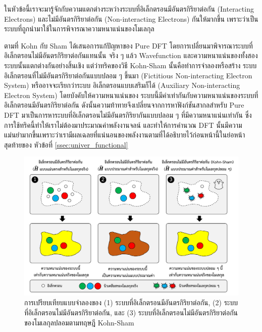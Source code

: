 ในหัวข้อนี้เราจะมารู้จักกับความแตกต่างระหว่างระบบที่อิเล็กตรอนมีอันตรกิริยาต่อกัน (Interacting Electrons) และไม่มีอันตรกิริยาต่อกัน 
(Non-interacting Electrons) กันให้มากขึ้น เพราะว่าเป็นระบบที่ถูกนำมาใช้ในการพิจารณาความหนาแน่นของโมเลกุล

ตามที่ Kohn กับ Sham ได้เสนอการแก้ปัญหาของ Pure DFT โดยการเปลี่ยนมาพิจารณาระบบที่อิเล็กตรอนไม่มีอันตรกิริยาต่อกันแทนนั้น จริง ๆ 
แล้ว Wavefunction และความหนาแน่นของทั้งสองระบบนั้นแตกต่างกันอย่างสิ้นเชิง แต่ว่าทริคของวิธี Kohn-Sham นั้นคือทำการจำลองหรือสร้าง%
ระบบอิเล็กตรอนที่ไม่มีอันตรกิริยาต่อกันแบบปลอม ๆ ขึ้นมา (Fictitious Non-interacting Electron System) หรืออาจจะเรียกว่าระบบ%
อิเล็กตรอนแบบเสริมก็ได้ (Auxiliary Non-interacting Electron System)\autocite{martin2020} โดยบังคับให้ความหนาแน่นของ%
ระบบนี้มีค่าเท่ากันกับความหนาแน่นของระบบที่อิเล็กตรอนมีอันตรกิริยาต่อกัน ดังนั้นความท้าทายจึงเปลี่ยนจากการหาฟังก์ชันสากลสำหรับ Pure DFT 
มาเป็นการหาระบบที่อิเล็กตรอนไม่มีอันตรกิริยากันแบบปลอม ๆ ที่มีความหนาแน่นเท่ากัน ซึ่งการใช้ทริคนี้ทำให้เราไม่ต้องมาประมาณค่าพลังงานจลน์%
และทำให้การคำนวณ DFT นั้นมีความแม่นยำมากขึ้นเพราะว่าเรามีผลเฉลยที่แน่นอนของพลังงานตามที่ได้อธิบายไว้ก่อนหน้านี้ในย่อหน้าสุดท้ายของ%
หัวข้อที่ \ref{ssec:univer_functional}

\begin{figure}[htbp]
    \centering
    \includegraphics[width=\linewidth]{fig/electron_system.png}
    \caption{การเปรียบเทียบแบบจำลองของ (1) ระบบที่อิเล็กตรอนมีอันตรกิริยาต่อกัน, (2) ระบบที่อิเล็กตรอนไม่มีอันตรกิริยาต่อกัน, และ 
    (3) ระบบที่อิเล็กตรอนไม่มีอันตรกิริยาต่อกันของโมเลกุลปลอมตามทฤษฎี Kohn-Sham}
    \label{fig:electron_system}
\end{figure}

